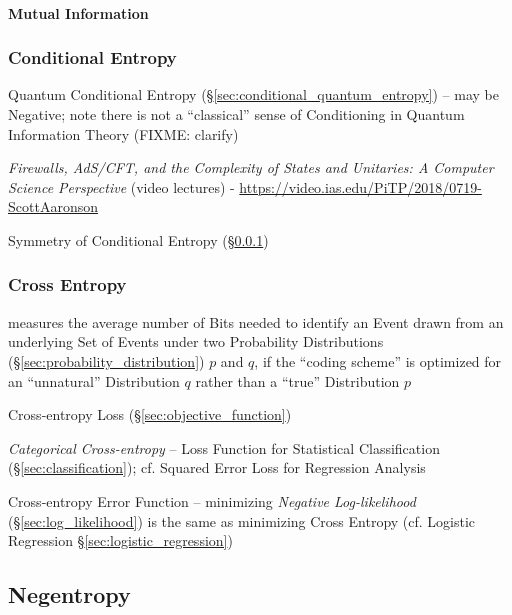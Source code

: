 \paragraph{Mutual Information}\label{sec:mutual_information}\hfill



\subsubsection{Conditional Entropy}\label{sec:conditional_entropy}

\fist Quantum Conditional Entropy (\S\ref{sec:conditional_quantum_entropy}) --
may be Negative; note there is not a ``classical'' sense of Conditioning in
Quantum Information Theory (FIXME: clarify)

\asterism

\emph{Firewalls, AdS/CFT, and the Complexity of States and Unitaries: A Computer
  Science Perspective}
(video lectures)
-
\url{https://video.ias.edu/PiTP/2018/0719-ScottAaronson}

Symmetry of Conditional Entropy (\S\ref{sec:conditional_entropy})



\subsubsection{Cross Entropy}\label{sec:cross_entropy}

measures the average number of Bits needed to identify an Event drawn from an
underlying Set of Events under two Probability Distributions
(\S\ref{sec:probability_distribution}) $p$ and $q$, if the ``coding scheme'' is
optimized for an ``unnatural'' Distribution $q$ rather than a ``true''
Distribution $p$

Cross-entropy Loss (\S\ref{sec:objective_function})

\emph{Categorical Cross-entropy} -- Loss Function for Statistical Classification
(\S\ref{sec:classification}); cf. Squared Error Loss for Regression Analysis

\fist Cross-entropy Error Function -- minimizing \emph{Negative Log-likelihood}
(\S\ref{sec:log_likelihood}) is the same as minimizing Cross Entropy (cf.
Logistic Regression \S\ref{sec:logistic_regression})



\subsection{Negentropy}\label{sec:negentropy}



